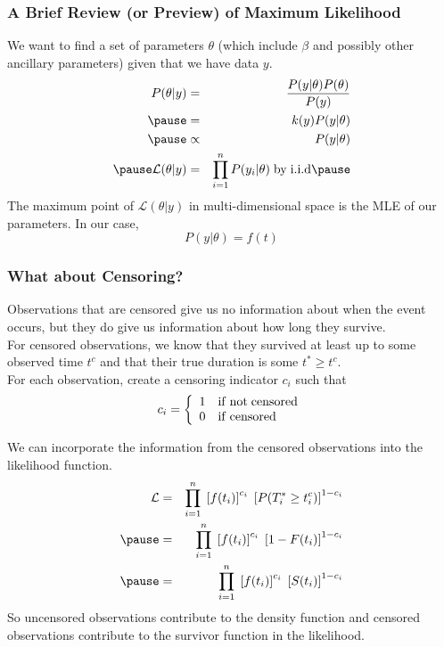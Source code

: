\documentclass{beamer}
\begin{document}
\begin{frame}
\frametitle{A Brief Review (or Preview) of Maximum Likelihood}
\pause
We want to find a set of parameters $\theta$ (which include $\beta$
and possibly other ancillary parameters) given that we have data $y$.
\pause
\begin{eqnarray*}
P(\theta | y) &=& \frac{P(y|\theta)P(\theta)}{P(y)}\\
\pause
 &=& k(y) P(y|\theta)\\
\pause
&\propto& P(y|\theta)\\
\pause
\mathcal{L}(\theta | y) &=& \prod_{i=1}^n P(y_i|\theta) \; \mathrm{by \; i.i.d}
\pause
\end{eqnarray*}
The maximum point of $\mathcal{L}(\theta | y)$ in multi-dimensional space is the
MLE of our parameters.  \pause In our case,
\begin{equation*}
P(y|\theta) = f(t)
\end{equation*}
\end{frame}

\begin{frame}
\frametitle{What about Censoring?}
\pause
Observations that are censored give us no information about when the
event occurs, but they do give us information about how long they survive.\\
\pause
\bigskip
For censored observations, we know that they survived at least up to some
observed time $t^c$ and that their true duration is some $t^* \ge t^c$.\\
\pause
\bigskip
For each observation, create a censoring indicator $c_i$ such that 
\begin{eqnarray*}
c_i = \left \lbrace \begin{array}{l l}1 & \mathrm{if \; not \; censored}\\
0 & \mathrm{if \; censored}\end{array} \right.
\end{eqnarray*}
\end{frame}

\begin{frame}
We can incorporate the information from the censored observations into
the likelihood function.
\pause
\begin{eqnarray*}
\mathcal{L} &=& \prod^n_{i=1} \; \left[ f(t_i) \right] ^
{c_i} \; \left[ P(T_i^* \ge t_i^c) \right] ^ {1 - c_i}\\
\pause
&=& \prod^n_{i=1} \; \left[ f(t_i) \right] ^
{c_i} \; \left[ 1 - F(t_i) \right] ^ {1 - c_i} \\ 
\pause
&=& \prod^n_{i=1} \; \left[ f(t_i) \right] ^
{c_i} \; \left[ S(t_i) \right] ^ {1 - c_i} \\  
\end{eqnarray*}
\pause
So uncensored observations contribute to the density function and
censored observations contribute to the survivor function in the likelihood.
\end{frame}
\end{document}

